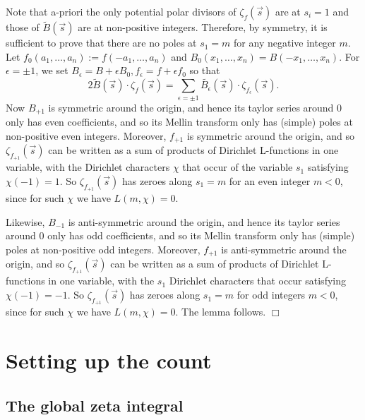 \documentclass{article}
\def\wt{\widetilde}
\newenvironment{proof}{\noindent {\bf Proof:}}{$\Box$ \vspace{2 ex}}
\begin{document}
\begin{proof}
Note that a-priori the only potential polar divisors of $\zeta_f(\vec s)$ are at $s_i=1$ and those of $\tilde{B}(\vec{s})$ are at non-positive integers. Therefore, by symmetry, it is sufficient to prove that there are no poles at $s_1=m$ for any negative integer $m$. Let $f_0(a_1,\dots,a_n):=f(-a_1,\dots,a_n)$ and $B_0(x_1,\dots,x_n)=B(-x_1,\dots,x_n)$. For $\epsilon=\pm 1$, we set $B_{\epsilon}=B+\epsilon B_0, f_{\epsilon}=f+\epsilon f_0$ so that 
$$2\wt{B}(\vec s)\cdot \zeta_f(\vec s) =\sum_{\epsilon=\pm 1}\wt{B_\epsilon}(\vec s)\cdot \zeta_{f_{\epsilon}}(\vec s) .$$
Now $B_{+1}$ is symmetric around the origin, and hence its taylor series around $0$ only has even coefficients, and so its Mellin transform only has (simple) poles at non-positive even integers. Moreover, $f_{+1}$ is symmetric around the origin, and so $\zeta_{f_{+1}}(\vec{s})$ can be written as a sum of products of Dirichlet L-functions in one variable, with the Dirichlet characters $\chi$ that occur of the variable $s_1$ satisfying $\chi(-1)=1$. So  $\zeta_{f_{+1}}(\vec{s})$ has zeroes along $s_1=m$ for an even integer $m<0$, since for such $\chi$ we have $L(m,\chi)=0$. 

Likewise, $B_{-1}$ is anti-symmetric around the origin, and hence its taylor series around $0$ only has odd coefficients, and so its Mellin transform only has (simple) poles at non-positive odd integers. Moreover, $f_{+1}$ is anti-symmetric around the origin, and so $\zeta_{f_{+1}}(\vec{s})$ can be written as a sum of products of Dirichlet L-functions in one variable, with the $s_1$ Dirichlet characters that occur satisfying $\chi(-1)=-1$. So  $\zeta_{f_{+1}}(\vec{s})$ has zeroes along $s_1=m$ for odd integers $m<0$, since for such $\chi$ we have $L(m,\chi)=0$.
The lemma follows.
\end{proof}

    







\section{Setting up the count}



\subsection{The global zeta integral}
\end{document}
